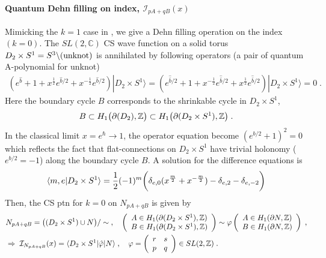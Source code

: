 \documentclass[a4paper,11pt]{article}
\def\cI{\mathcal{I}}
\begin{document}
\paragraph{Quantum Dehn filling on index, $\cI_{pA+qB}(x)$} Mimicking  the $k=1$ case in \cite{Bae:2016jpi,Gang:2017cwq} , we  give a Dehn filling operation on the index $(k=0)$. The $SL(2,\mathbb{C})$ CS wave function on a solid torus $D_2 \times S^1 = S^3\backslash ({\rm unknot})$ is annihilated by following operators (a pair of quantum A-polynomial for unknot)
%
\begin{align} 
(e^{\hat{b}}+1 + x^{\frac{1}2} e^{\hat{b}/2} +x^{-\frac{1}2} e^{\hat{b}/2})|D_2 \times S^1\rangle = (e^{\hat{\bar{b}}/2}+1 + x^{-\frac{1}2} e^{\hat{\bar{b}}/2} +x^{\frac{1}2}e^{\hat{\bar{b}}/2})|D_2 \times S^1\rangle =0\;.
\end{align}
%
Here the boundary cycle $B$ corresponds to the shrinkable cycle in $D_2 \times S^1$,
%
\begin{align}
B \subset H_1 \big{(}\partial (D_2),\mathbb{Z} \big{)} \subset H_1\big{(}\partial (D_2 \times S^1),\mathbb{Z}\big{)}\;.
\end{align}
%
In the classical limit $x = e^{\hbar}\rightarrow 1$, the operator equation become $(e^{b/2}+1)^2=0$  which reflects the fact that  flat-connections on $D_2 \times S^1$ have trivial holonomy ($e^{b/2}=-1$) along the boundary cycle $B$. 
A solution for the difference equations is
%
\begin{align}
\langle m, e| D_2 \times S^1\rangle = \frac{1}2(-1)^{m} \bigg{(}\delta_{e,0}(x^{\frac{m}2}+x^{- \frac{m}2})- \delta_{e,2}- \delta_{e,-2} \bigg{)}
\end{align}
%
Then, the CS ptn for $k=0$ on $N_{pA+ q B}$ is given by 
%
\begin{align}
\begin{split}
& N_{pA+qB} =\big{(} (D_2 \times S^1) \cup N \big{)}/\sim \;,\quad 
\left(\begin{array}{c}A \in H_1 (\partial ({D_2 \times S^1}),\mathbb{Z}) \\ B \in H_1 (\partial ({D_2 \times S^1}),\mathbb{Z}) \end{array}\right) \sim \varphi \left(\begin{array}{c} A \in H_1 (\partial N, \mathbb{Z}) \\ B \in H_1 (\partial N, \mathbb{Z})  \end{array}\right)\;,
\\
&\Rightarrow \; \cI_{N_{pA+qB}}(x) = \langle D_2 \times S^1 | \hat{\varphi}|N \rangle\;, \quad \varphi =\left(\begin{array}{cc}r & s \\ p & q\end{array}\right) \in SL(2,\mathbb{Z})\;. \label{DvarphiN}
\end{split}
\end{align}
\end{document}

